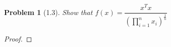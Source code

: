 \documentclass{article}
\newtheorem*{prob}{Problem} %
\begin{document}
\begin{prob}[1.3]
  Show that $f(x) = \dfrac{x^{T}x}{(\prod^{n}_{i=1} x_{i})^{\frac{1}{n}}}$
\end{prob}
\begin{proof}
\end{proof}
\end{document}
